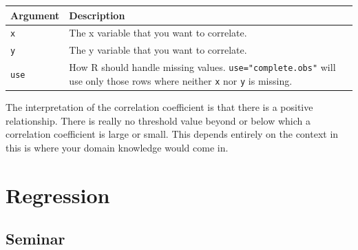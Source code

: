 \documentclass[]{article}
\begin{document}
\begin{longtable}[]{@{}ll@{}}
\toprule
\begin{minipage}[b]{0.11\columnwidth}\raggedright
Argument\strut
\end{minipage} & \begin{minipage}[b]{0.83\columnwidth}\raggedright
Description\strut
\end{minipage}\tabularnewline
\midrule
\endhead
\begin{minipage}[t]{0.11\columnwidth}\raggedright
\texttt{x}\strut
\end{minipage} & \begin{minipage}[t]{0.83\columnwidth}\raggedright
The x variable that you want to correlate.\strut
\end{minipage}\tabularnewline
\begin{minipage}[t]{0.11\columnwidth}\raggedright
\texttt{y}\strut
\end{minipage} & \begin{minipage}[t]{0.83\columnwidth}\raggedright
The y variable that you want to correlate.\strut
\end{minipage}\tabularnewline
\begin{minipage}[t]{0.11\columnwidth}\raggedright
\texttt{use}\strut
\end{minipage} & \begin{minipage}[t]{0.83\columnwidth}\raggedright
How R should handle missing values. \texttt{use="complete.obs"} will use only those rows where neither \texttt{x} nor \texttt{y} is missing.\strut
\end{minipage}\tabularnewline
\bottomrule
\end{longtable}

The interpretation of the correlation coefficient is that there is a positive relationship. There is really no threshold value beyond or below which a correlation coefficient is large or small. This depends entirely on the context in this is where your domain knowledge would come in.

\hypertarget{regression}{%
\section{Regression}\label{regression}}

\hypertarget{seminar-7}{%
\subsection{Seminar}\label{seminar-7}}
\end{document}
